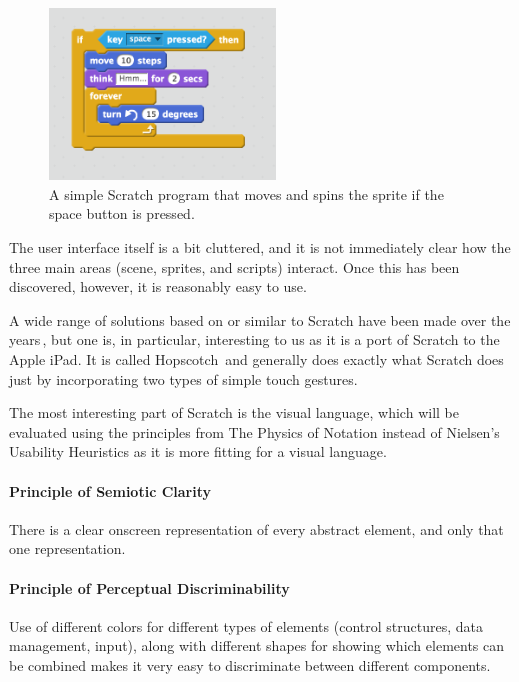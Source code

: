 \begin{figure}
	\centering
		\includegraphics[width=60mm]{diagrams/ScratchProgram.png}
	\caption{A simple Scratch program that moves and spins the sprite if the space
	button is pressed.}
\label{fig:ScratchProgram}
\end{figure}

The user interface itself is a bit cluttered, and it is not immediately clear how the three main areas (scene, sprites, and scripts) interact. Once this has been discovered, however, it is reasonably easy to use. 

A wide range of solutions based on or similar to Scratch have been made over the years\,\cite{hosick2014}, but one is, in particular, interesting to us as it is a port of Scratch to the Apple iPad. It is called Hopscotch\,\cite{hopscotch} and generally does exactly what Scratch does just by incorporating two types of simple touch gestures.

The most interesting part of Scratch is the visual language, which will be evaluated using the principles from The Physics of Notation  instead of Nielsen's Usability Heuristics as it is more fitting
for a visual language.

\paragraph{Principle of Semiotic Clarity}
There is a clear onscreen representation of every abstract element, and only that one representation.

\paragraph{Principle of Perceptual Discriminability}
Use of different colors for different types of elements (control structures, data management, input), along with different shapes for showing which elements can be combined makes it very easy to discriminate between different components.

